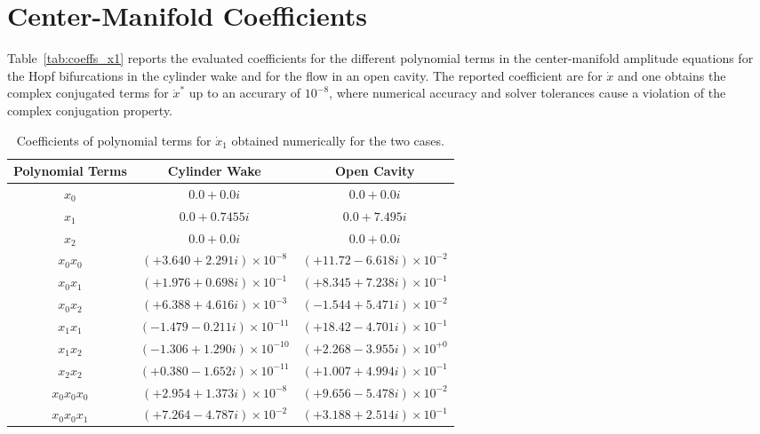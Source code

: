 \appendix

\section{Center-Manifold Coefficients} 
\label{AppendixA}

Table~\ref{tab:coeffs_x1} reports the evaluated coefficients for the different polynomial terms in the center-manifold amplitude equations for the Hopf bifurcations in the cylinder wake and for the flow in an open cavity. The reported coefficient are for $\dot{x}$ and one obtains the complex conjugated terms for $\dot{x}^{*}$ up to an accurary of $10^{-8}$, where numerical accuracy and solver tolerances cause a violation of the complex conjugation property.

\begin{table*}
	\centering
	\caption{Coefficients of polynomial terms for $\dot{x}_{1}$ obtained numerically for the two cases. }
	\begin{tabular}{c | c | c}
		Polynomial Terms  & Cylinder Wake		                  & Open Cavity\\
		\hline\hline
		$x_{0}$           & $0.0 + 0.0i$ 				      & $0.0 + 0.0i$ 			     \\
		$x_{1}$           & $0.0 + 0.7455i$ 				& $0.0 + 7.495i$   		     \\
		$x_{2}$           & $0.0 + 0.0i$ 					& $0.0 + 0.0i$ 			     \\
            $x_{0}x_{0}$      & $(+3.640 + 2.291i)\times10^{-8}$ 	      & $(+11.72 - 6.618i)\times10^{-2}$ \\
		$x_{0}x_{1}$      & $(+1.976 + 0.698i)\times10^{-1}$ 		& $(+8.345 + 7.238i)\times10^{-1}$ \\
		$x_{0}x_{2}$      & $(+6.388 + 4.616i)\times10^{-3}$ 		& $(-1.544 + 5.471i)\times10^{-2}$ \\
		$x_{1}x_{1}$      & $(-1.479 - 0.211i)\times10^{-11}$ 	& $(+18.42 - 4.701i)\times10^{-1}$ \\
		$x_{1}x_{2}$      & $(-1.306 + 1.290i)\times10^{-10}$ 	& $(+2.268 - 3.955i)\times10^{+0}$ \\
            $x_{2}x_{2}$      & $(+0.380 - 1.652i)\times10^{-11}$ 	& $(+1.007 + 4.994i)\times10^{-1}$ \\
            $x_{0}x_{0}x_{0}$	& $(+2.954 + 1.373i)\times10^{-8}$        & $(+9.656 - 5.478i)\times10^{-2}$ \\ 
            $x_{0}x_{0}x_{1}$	& $(+7.264 - 4.787i)\times10^{-2}$        & $(+3.188 + 2.514i)\times10^{-1}$ \\

\end{tabular}
\end{table*}
